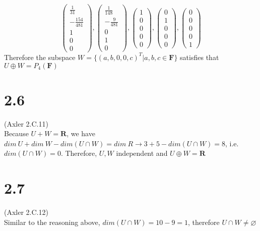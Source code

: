 \documentclass{article}
\begin{document}
\begin{equation*}
        \begin{pmatrix}
    \frac{1}{31}\\
    -\frac{154}{481}\\
    1\\
    0\\
    0
    \end{pmatrix},
    \begin{pmatrix}
    \frac{1}{148}\\
    -\frac{9}{481}\\
    0\\
    1\\
    0
    \end{pmatrix},
    \begin{pmatrix}
    1\\
    0\\
    0\\
    0\\
    0
    \end{pmatrix},
    \begin{pmatrix}
    0\\
    1\\
    0\\
    0\\
    0
    \end{pmatrix},
    \begin{pmatrix}
    0\\
    0\\
    0\\
    0\\
    1
    \end{pmatrix}
\end{equation*}
Therefore the subspace $W = \{(a,b,0,0,c)^T|a,b,c \in \textbf{F}\}$ satisfies that $U \oplus W = P_4(\textbf{F})$
\section{2.6}
(Axler 2.C.11)\\
Because $U+W = \mathbf{R}$, we have $dim\ U + dim\ W - dim(U \cap W) = dim\ R \rightarrow 3 + 5 - dim(U \cap W) = 8$, i.e. $dim(U \cap W) = 0$. Therefore, $U, W$ independent and $U \oplus W = \mathbf{R}$
\section{2.7}
(Axler 2.C.12)\\
Similar to the reasoning above, $dim(U \cap W) = 10 - 9 = 1$, therefore $U \cap W \neq \varnothing$
\end{document}
